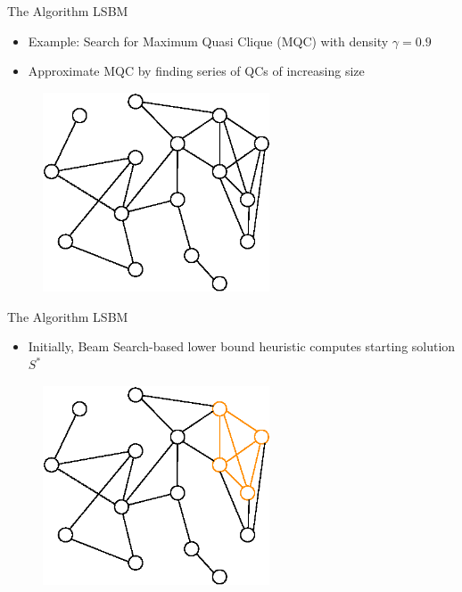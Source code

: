 \documentclass{beamer}
\begin{document}
\begin{frame}{The Algorithm LSBM}
    \begin{itemize}
        \item Example: Search for Maximum Quasi Clique (MQC) with density $\gamma=0.9$ \\
        \item Approximate MQC by finding series of QCs of increasing size
    \end{itemize}
    \begin{figure}
        \centering
        \includegraphics[width=0.6\textwidth]{graphics/algorithm_poster_0.eps}
    \end{figure}
\end{frame}

\begin{frame}{The Algorithm LSBM}
    \begin{itemize}
        \item Initially, Beam Search-based lower bound heuristic computes starting solution $S^*$ \\
    \end{itemize}
    \begin{figure}
        \centering
        \includegraphics[width=0.6\textwidth]{graphics/algorithm_poster_1.eps}
    \end{figure}
\end{frame}
\end{document}
